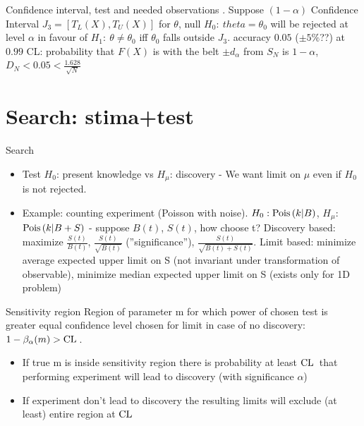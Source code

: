 \documentclass[asd-beamer.tex]{subfiles}%
\begin{document}
\begin{frame}{Confidence interval, test and needed observations}\frameintoc
{}. Suppose $(1-\alpha)$ Confidence Interval $J_3=[T_L(X),T_U(X)]$ for $\theta$, null $H_0:\ theta=\theta_0$ will be rejected at level $\alpha$ in favour of $H_1:\ \theta\neq\theta_0$ iff $\theta_0$ falls outside $J_3$.
 accuracy $0.05$ ($\pm5\%$??) at $0.99$ CL: probability that $F(X)$ is with the belt $\pm d_{\alpha}$ from $S_N$ is $1-\alpha$, $D_N<0.05<\frac{1.628}{\sqrt{N}}$
\end{frame}


\section{Search: stima+test}

\begin{frame}{Search}
    \begin{itemize}
        \item Test $H_0$: present knowledge vs $H_{\mu}$: discovery - We want limit on $\mu$ even if $H_0$ is not rejected.
            \item Example: counting experiment (Poisson with noise). $H_0: \operatorname{Pois}{(k|B)}$, $H_{\mu}$: $\operatorname{Pois}{(k|B+S)}$ - suppose $B(t)$, $S(t)$, how choose t? Discovery based: maximize $\frac{S(t)}{B(t)}$, $\frac{S(t)}{\sqrt{B(t)}}$ (''significance''), $\frac{S(t)}{\sqrt{B(t)+S(t)}}$. Limit based: minimize average expected upper limit on S (not invariant under transformation of observable), minimize median expected upper limit on S (exists only for 1D problem)
\end{itemize}
            \end{frame}

\begin{frame}{Sensitivity region}
Region of parameter m for which power of chosen test is greater equal confidence level chosen for limit in case of no discovery: $1-\beta_{\alpha}(m)>\operatorname{CL}{}$.
\begin{itemize}
\item If true m is inside sensitivity region there is probability at least $\operatorname{CL}{}$ that performing experiment will lead to discovery (with significance $\alpha$)
\item If experiment don't lead to discovery the resulting limits will exclude (at least) entire region at $\operatorname{CL}{}$
\end{itemize}
\end{frame}
\end{document}
